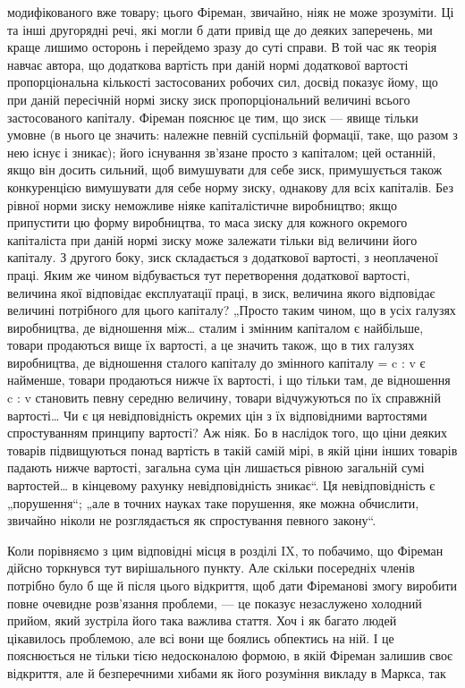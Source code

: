 \parcont{}  %
модифікованого вже товару; цього Фіреман, звичайно, ніяк не
може зрозуміти. Ці та інші другорядні речі, які могли б дати
привід ще до деяких заперечень, ми краще лишимо осторонь
і перейдемо зразу до суті справи. В той час як теорія навчає
автора, що додаткова вартість при даній нормі додаткової вартості
пропорціональна кількості застосованих робочих сил, досвід
показує йому, що при даній пересічній нормі зиску зиск
пропорціональний величині всього застосованого капіталу. Фіреман
пояснює це тим, що зиск — явище тільки умовне (в нього
це значить: належне певній суспільній формації, таке, що разом
з нею існує і зникає); його існування зв’язане просто з капіталом;
цей останній, якщо він досить сильний, щоб вимушувати
для себе зиск, примушується також конкуренцією вимушувати
для себе норму зиску, однакову для всіх капіталів. Без рівної
норми зиску неможливе ніяке капіталістичне виробництво; якщо
припустити цю форму виробництва, то маса зиску для кожного
окремого капіталіста при даній нормі зиску може залежати тільки
від величини його капіталу. З другого боку, зиск складається
з додаткової вартості, з неоплаченої праці. Яким же чином відбувається
тут перетворення додаткової вартості, величина якої
відповідає експлуатації праці, в зиск, величина якого відповідає
величині потрібного для цього капіталу? „Просто таким чином,
що в усіх галузях виробництва, де відношення між\dots{} сталим
і змінним капіталом є найбільше, товари продаються вище їх
вартості, а це значить також, що в тих галузях виробництва,
де відношення сталого капіталу до змінного капіталу = c : v є
найменше, товари продаються нижче їх вартості, і що тільки
там, де відношення c : v становить певну середню величину,
товари відчужуються по їх справжній вартості\dots{} Чи є ця невідповідність
окремих цін з їх відповідними вартостями спростуванням
принципу вартості? Аж ніяк. Бо в наслідок того, що
ціни деяких товарів підвищуються понад вартість в такій самій
мірі, в якій ціни інших товарів падають нижче вартості, загальна
сума цін лишається рівною загальній сумі вартостей\dots{}
в кінцевому рахунку невідповідність зникає“. Ця невідповідність
є „порушення“; „але в точних науках таке порушення, яке можна
обчислити, звичайно ніколи не розглядається як спростування
певного закону“.

Коли порівняємо з цим відповідні місця в розділі IX, то побачимо,
що Фіреман дійсно торкнувся тут вирішального пункту.
Але скільки посередніх членів потрібно було б ще й після цього
відкриття, щоб дати Фіреманові змогу виробити повне очевидне
розв’язання проблеми, — це показує незаслужено холодний
прийом, який зустріла його така важлива стаття. Хоч і як багато
людей цікавилось проблемою, але всі вони ще боялись обпектись
на ній. І це пояснюється не тільки тією недосконалою
формою, в якій Фіреман залишив своє відкриття, але й безперечними
хибами як його розуміння викладу в Маркса, так
\parbreak{}  %

